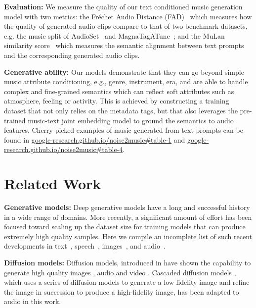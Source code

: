\documentclass[nohyperref]{article}
\newcommand{\website}{https://google-research.github.io/noise2music}
\newcommand{\websiteDisplay}{google-research.github.io/noise2music}
\theoremstyle{plain}
\theoremstyle{definition}
\theoremstyle{remark}
\begin{document}
\textbf{Evaluation:} We measure the quality of our text conditioned music generation model with two metrics: the Fr\'echet Audio Distance (FAD)~\cite{kilgour2018fr} which measures how the quality of generated audio clips compare to that of two benchmark datasets, e.g. the music split of AudioSet~\cite{gemmeke2017audio} and MagnaTagATune~\cite{law2009evaluation}; and the MuLan similarity score~\cite{mulan2022} which measures the semantic alignment between text prompts and the corresponding generated audio clips. 

\textbf{Generative ability:} Our models demonstrate that they can go beyond simple music attribute conditioning, e.g., genre, instrument, era, and are able to handle complex and fine-grained semantics which can reflect soft attributes such as atmosphere, feeling or activity. This is achieved by constructing a training dataset that not only relies on the metadata tags, but that also leverages the pre-trained music-text joint embedding model to ground the semantics to audio features. Cherry-picked examples of music generated from text prompts can be found in  \href{\website#table-1}{\websiteDisplay\#table-1} and \href{\website#table-4}{\websiteDisplay\#table-4}.

\section{Related Work}
\noindent\textbf{Generative models:}
Deep generative models have a long and successful history in a wide range of domains. More recently, a significant amount of effort has been focused toward scaling up the dataset size for training models that can produce extremely high quality samples. Here we compile an incomplete list of such recent developments in text~\cite{brown2020language,thoppilan2022lamda}, speech~\cite{wang2018style, chen2021wavegrad,audiolm}, images~\cite{ramesh2022hierarchical,saharia2022photorealistic,yu2022scaling}, and audio~\cite{briot2021artificial,dhariwal2020jukebox,mubert,kreuk2022audiogen}. 
 

\noindent\textbf{Diffusion models:}
Diffusion models, introduced in \cite{sohl2015deep,song2019generative,ho2020denoising} have shown the capability to generate high quality images \cite{ho2020denoising,ho2022cascaded}, audio \cite{yang2022diffsound, popov2021grad} and video \cite{ho2022video,ho2022imagen}. Cascaded diffusion models \cite{ho2022cascaded,saharia2022photorealistic}, which uses a series of diffusion models to generate a low-fidelity image and refine the image in succession to produce a high-fidelity image, has been adapted to audio in this work.
\end{document}

